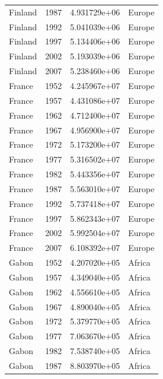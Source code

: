 \documentclass[
  letterpaper,
  DIV=11,
  numbers=noendperiod]{scrreprt}
\begin{document}
\begin{tcolorbox}
\begin{tabular}{lrrl}
Finland                  &  1987 &  4.931729e+06 &    Europe \\
Finland                  &  1992 &  5.041039e+06 &    Europe \\
Finland                  &  1997 &  5.134406e+06 &    Europe \\
Finland                  &  2002 &  5.193039e+06 &    Europe \\
Finland                  &  2007 &  5.238460e+06 &    Europe \\
France                   &  1952 &  4.245967e+07 &    Europe \\
France                   &  1957 &  4.431086e+07 &    Europe \\
France                   &  1962 &  4.712400e+07 &    Europe \\
France                   &  1967 &  4.956900e+07 &    Europe \\
France                   &  1972 &  5.173200e+07 &    Europe \\
France                   &  1977 &  5.316502e+07 &    Europe \\
France                   &  1982 &  5.443356e+07 &    Europe \\
France                   &  1987 &  5.563010e+07 &    Europe \\
France                   &  1992 &  5.737418e+07 &    Europe \\
France                   &  1997 &  5.862343e+07 &    Europe \\
France                   &  2002 &  5.992504e+07 &    Europe \\
France                   &  2007 &  6.108392e+07 &    Europe \\
Gabon                    &  1952 &  4.207020e+05 &    Africa \\
Gabon                    &  1957 &  4.349040e+05 &    Africa \\
Gabon                    &  1962 &  4.556610e+05 &    Africa \\
Gabon                    &  1967 &  4.890040e+05 &    Africa \\
Gabon                    &  1972 &  5.379770e+05 &    Africa \\
Gabon                    &  1977 &  7.063670e+05 &    Africa \\
Gabon                    &  1982 &  7.538740e+05 &    Africa \\
Gabon                    &  1987 &  8.803970e+05 &    Africa \\

\end{tabular}
\end{tcolorbox}
\end{document}
